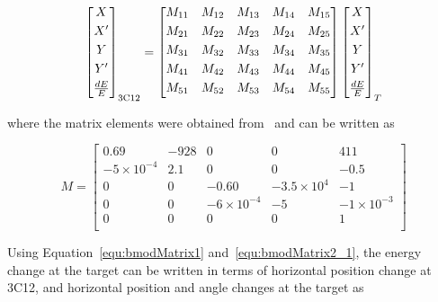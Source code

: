\begin{equation} \label{equ:bmodMatrix1}
    \begin{bmatrix}
       X\\[0.3em]
       X^{\prime}\\[0.3em]
       Y\\[0.3em]
       Y^{\prime}\\[0.3em]
       \frac{dE}{E}\\[0.3em]
    \end{bmatrix}_{\rm 3C12}
	=
	\begin{bmatrix}
       M_{11} & M_{12} & M_{13} & M_{14} & M_{15} \\[0.3em]
       M_{21} & M_{22} & M_{23} & M_{24} & M_{25} \\[0.3em]
       M_{31} & M_{32} & M_{33} & M_{34} & M_{35} \\[0.3em]
       M_{41} & M_{42} & M_{43} & M_{44} & M_{45} \\[0.3em]
       M_{51} & M_{52} & M_{53} & M_{54} & M_{55} \\[0.3em]
    \end{bmatrix}
    \begin{bmatrix}
       X\\[0.3em]
       X^{\prime}\\[0.3em]
       Y\\[0.3em]
       Y^{\prime}\\[0.3em]
       \frac{dE}{E}\\[0.3em]
    \end{bmatrix}_{T}
\end{equation}

where the matrix elements were obtained from~\cite{optim_deck} and can be written as

\begin{equation} \label{equ:bmodMatrix2_1}
M	=
	\begin{bmatrix}
       0.69 & -928 & 0 & 0 & 411 \\[0.3em]
       -5\times 10^{-4} & 2.1 & 0 & 0 & -0.5 \\[0.3em]
       0 & 0 & -0.60 & -3.5\times 10^{4} & -1 \\[0.3em]
       0 & 0 & -6\times 10^{-4} & -5 & -1\times 10^{-3} \\[0.3em]
       0 & 0 & 0 & 0 & 1 \\[0.3em]
    \end{bmatrix}
\end{equation}

Using Equation~\ref{equ:bmodMatrix1} and~\ref{equ:bmodMatrix2_1}, the energy change at the target can be written in terms of horizontal position change at 3C12, and horizontal position and angle changes at the target as 

